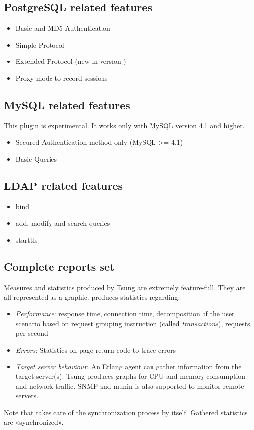\documentclass{TSUNG-en}
\begin{document}
\subsection{PostgreSQL related features}

\begin{itemize}
\item Basic and MD5 Authentication
\item Simple Protocol
\item Extended Protocol (new in version  )
\item Proxy mode to record sessions
\end{itemize}

\subsection{MySQL related features}
This plugin is experimental. It works only with MySQL version 4.1 and higher.
\begin{itemize}
\item Secured Authentication method only (MySQL >= 4.1)
\item Basic Queries
\end{itemize}

\subsection{LDAP related features}

\begin{itemize}
\item bind
\item add, modify and search queries
\item starttls
\end{itemize}

\subsection{Complete reports set}

Measures and statistics produced by Tsung are extremely feature-full.
They are all represented as a graphic.  produces
statistics regarding:

\begin{itemize}
\item \emph{Performance}: response time, connection time,  decomposition of the user scenario based on request grouping  instruction (called \textit{transactions}), requests per second
\item \emph{Errors}: Statistics on page return code to trace errors
\item \emph{Target server behaviour}: An Erlang agent can gather information
from the target server(s). Tsung produces graphs for CPU and memory
consumption and network traffic. SNMP and munin is also supported to
monitor remote servers.
\end{itemize}
\par Note that  takes care of the synchronization process
by itself. Gathered statistics are «synchronized».
\end{document}
